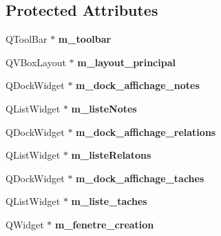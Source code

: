 \subsection*{Protected Attributes}
\begin{DoxyCompactItemize}
\item 
\mbox{\label{class_fen_principale_a3df178449f05185255f1404c09a4b14f}} 
Q\+Tool\+Bar $\ast$ {\bfseries m\+\_\+toolbar}
\item 
\mbox{\label{class_fen_principale_a89d25cfb941913941467b8e4a2d3237b}} 
Q\+V\+Box\+Layout $\ast$ {\bfseries m\+\_\+layout\+\_\+principal}
\item 
\mbox{\label{class_fen_principale_a08eeb215ef246ea0b94271054c7834a7}} 
Q\+Dock\+Widget $\ast$ {\bfseries m\+\_\+dock\+\_\+affichage\+\_\+notes}
\item 
\mbox{\label{class_fen_principale_a63e6c72aec15e38b352c48c13756863d}} 
Q\+List\+Widget $\ast$ {\bfseries m\+\_\+liste\+Notes}
\item 
\mbox{\label{class_fen_principale_ad617568d32e9b30f23a764d9e3e5ae06}} 
Q\+Dock\+Widget $\ast$ {\bfseries m\+\_\+dock\+\_\+affichage\+\_\+relations}
\item 
\mbox{\label{class_fen_principale_a74faa19e906e866482342d4eed32ddb2}} 
Q\+List\+Widget $\ast$ {\bfseries m\+\_\+liste\+Relatons}
\item 
\mbox{\label{class_fen_principale_adbdeb87d688dfc4845f52f71d31f8d71}} 
Q\+Dock\+Widget $\ast$ {\bfseries m\+\_\+dock\+\_\+affichage\+\_\+taches}
\item 
\mbox{\label{class_fen_principale_a79ea73002a07dc2a895e1692fa976005}} 
Q\+List\+Widget $\ast$ {\bfseries m\+\_\+liste\+\_\+taches}
\item 
\mbox{\label{class_fen_principale_abbd84cf259e308941b926573d1bdfe6a}} 
Q\+Widget $\ast$ {\bfseries m\+\_\+fenetre\+\_\+creation}
\item 
\mbox{\label{class_fen_principale_a23d1292d5ce03b6375b19daada8ccff9}} 

\end{DoxyCompactItemize}
